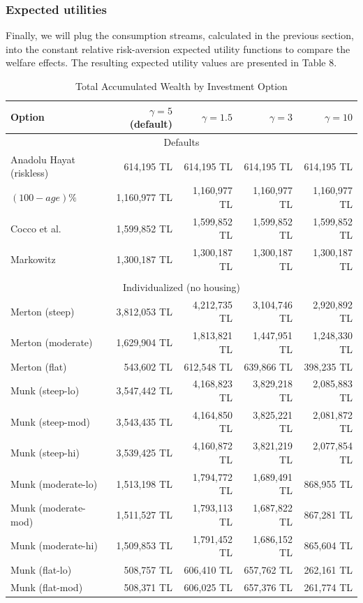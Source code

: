 \documentclass[]{article}
\begin{document}
\subsubsection{Expected utilities}
Finally, we will plug the consumption streams, calculated in the previous section, into the constant relative risk-aversion expected utility functions to compare the welfare effects. The resulting expected utility values are presented in Table 8.


\begin{table}%
	\centering
	\caption{Total Accumulated Wealth by Investment Option}
	\begin{tabular}[c]{lrrrr}
		\hline
		Option&$\gamma=5$ (default) & $\gamma=1.5$ & $\gamma=3$ & $\gamma=10$\\
		\hline
		\multicolumn{5}{c}{Defaults}\\
Anadolu Hayat (riskless)&614,195 TL&614,195 TL&614,195 TL&614,195 TL\\
$(100-age)\%$&1,160,977 TL&1,160,977 TL&1,160,977 TL&1,160,977 TL\\
Cocco et al.&1,599,852 TL&1,599,852 TL&1,599,852 TL&1,599,852 TL\\
Markowitz&1,300,187 TL&1,300,187 TL&1,300,187 TL&1,300,187 TL\\
\multicolumn{5}{c}{}\\
\multicolumn{5}{c}{Individualized (no housing)}\\
Merton (steep)&3,812,053 TL&4,212,735 TL&3,104,746 TL&2,920,892 TL\\
Merton (moderate)&1,629,904 TL&1,813,821 TL&1,447,951 TL&1,248,330 TL\\
Merton (flat)&543,602 TL&612,548 TL&639,866 TL&398,235 TL\\
Munk (steep-lo)&3,547,442 TL&4,168,823 TL&3,829,218 TL&2,085,883 TL\\
Munk (steep-mod)&3,543,435 TL&4,164,850 TL&3,825,221 TL&2,081,872 TL\\
Munk (steep-hi)&3,539,425 TL&4,160,872 TL&3,821,219 TL&2,077,854 TL\\
Munk (moderate-lo)&1,513,198 TL&1,794,772 TL&1,689,491 TL&868,955 TL\\
Munk (moderate-mod)&1,511,527 TL&1,793,113 TL&1,687,822 TL&867,281 TL\\
Munk (moderate-hi)&1,509,853 TL&1,791,452 TL&1,686,152 TL&865,604 TL\\
Munk (flat-lo)&508,757 TL&606,410 TL&657,762 TL&262,161 TL\\
Munk (flat-mod)&508,371 TL&606,025 TL&657,376 TL&261,774 TL\\

\end{tabular}
\end{table}
\end{document}
